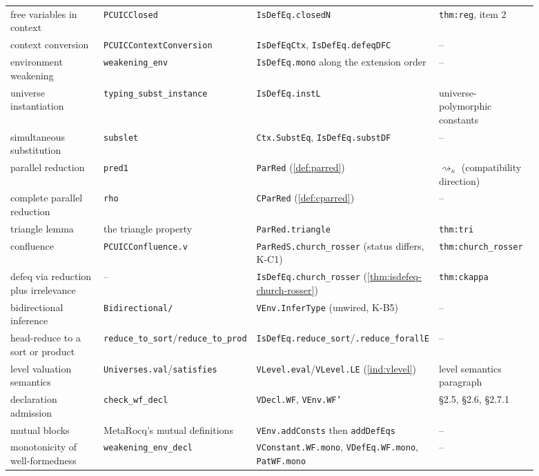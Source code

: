 \begin{tabular}{p{0.23\linewidth}p{0.19\linewidth}p{0.27\linewidth}p{0.20\linewidth}}
free variables in context & \texttt{PCUICClosed} & \texttt{IsDefEq.closedN} & \texttt{thm:reg},
item 2 \\
context conversion & \texttt{PCUICContextConversion} & \texttt{IsDefEqCtx},
\texttt{IsDefEq.defeqDFC} & -- \\
environment weakening & \texttt{weakening\_env} & \texttt{IsDefEq.mono} along the extension order
& -- \\
universe instantiation & \texttt{typing\_subst\_instance} & \texttt{IsDefEq.instL} &
universe-polymorphic constants \\
simultaneous substitution & \texttt{subslet} & \texttt{Ctx.SubstEq}, \texttt{IsDefEq.substDF} &
-- \\
parallel reduction & \texttt{pred1} & \texttt{ParRed} (\ref{def:parred}) & $\rightsquigarrow_\kappa$
(compatibility direction) \\
complete parallel reduction & \texttt{rho} & \texttt{CParRed} (\ref{def:cparred}) & -- \\
triangle lemma & the triangle property & \texttt{ParRed.triangle} & \texttt{thm:tri} \\
confluence & \texttt{PCUICConfluence.v} & \texttt{ParRedS.church\_rosser} (status differs, K-C1)
& \texttt{thm:church\_rosser} \\
defeq via reduction plus irrelevance & -- & \texttt{IsDefEq.church\_rosser}
(\ref{thm:isdefeq-church-rosser}) & \texttt{thm:ckappa} \\
bidirectional inference & \texttt{Bidirectional/} & \texttt{VEnv.InferType} (unwired, K-B5) & --
\\
head-reduce to a sort or product & \texttt{reduce\_to\_sort}/\texttt{reduce\_to\_prod} &
\texttt{IsDefEq.reduce\_sort}/\texttt{.reduce\_forallE} & -- \\
level valuation semantics & \texttt{Universes.val}/\texttt{satisfies} &
\texttt{VLevel.eval}/\texttt{VLevel.LE} (\ref{ind:vlevel}) & level semantics paragraph \\
declaration admission & \texttt{check\_wf\_decl} & \texttt{VDecl.WF}, \texttt{VEnv.WF'} & \S2.5,
\S2.6, \S2.7.1 \\
mutual blocks & MetaRocq's mutual definitions & \texttt{VEnv.addConsts} then
\texttt{addDefEqs} & -- \\
monotonicity of well-formedness & \texttt{weakening\_env\_decl} & \texttt{VConstant.WF.mono},
\texttt{VDefEq.WF.mono}, \texttt{PatWF.mono} & -- \\
\bottomrule
\end{tabular}\par\smallskip

